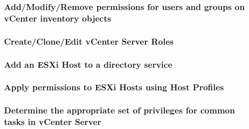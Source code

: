 \subsubsection{Add/Modify/Remove permissions for users and groups on vCenter inventory objects}

\subsubsection{Create/Clone/Edit vCenter Server Roles}

\subsubsection{Add an ESXi Host to a directory service}

\subsubsection{Apply permissions to ESXi Hosts using Host Profiles}

\subsubsection{Determine the appropriate set of privileges for common tasks in vCenter Server}
